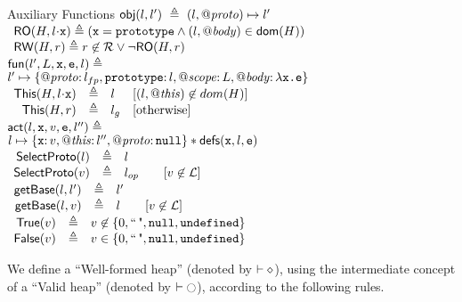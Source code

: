 \documentclass{article}
\begin{document}
\begin{display}{Auxiliary Functions}
%
$\mathsf{obj}(l,l')\ \triangleq\ (l,\mathit{@proto})\mapsto l'$\\
%
$\begin{array}{l}
\ReadOnly(H,l\sv\js{x})\triangleq (\js{x}=\js{prototype}\wedge (l,\bodyp)\in\domain(H))\\
\ReadWrite(H,r)\triangleq r\not\in\refs \vee \neg \ReadOnly(H,r)\end{array}$\\
%
$\mathsf{fun}(l',L,\mbox{\texttt{{\upshape x}}},\mbox{\texttt{{\upshape e}}},l)\triangleq$\\
$ l'\mapsto\{\mathit{@proto}{:\,}l_{fp},\mbox{\texttt{{\upshape prototype}}}{:\,} l,\mathit{@scope}{:\,} L,\mathit{@body}{:\,}\lambda \mbox{\texttt{{\upshape x.e}}}\}$\\
%
$\begin{array}{rlll}
        \pickThis(H,l\sv \js{x})&\triangleq &l &[(l,\thisp)\not\in dom(H)]\\
        \pickThis(H,\njs{r})&\triangleq& \lgo &[\text{otherwise}]
\end{array}$\\
%
$\mathsf{act}(l,\mbox{\texttt{{\upshape x}}},v,\mbox{\texttt{{\upshape e}}},l'') \triangleq$\\
$l\mapsto\{\mbox{\texttt{{\upshape x}}}{:\,} v,\mathit{@this}{:\,} l'',\mathit{@proto}{:\,} \mbox{\texttt{{\upshape null}}}\}\mathbin{*} \mathsf{defs}(\mbox{\texttt{{\upshape x}}},l,\mbox{\texttt{{\upshape e}}})$\\
%
$\begin{array}{rll}
        \mathsf{SelectProto}(l)&\triangleq& l\\
        \mathsf{SelectProto}(v)&\triangleq& l_{op} \qquad[v\not\in\mathcal{L}]
\end{array}$\\
%
$\begin{array}{rll}
        \mathsf{getBase}(l,l')&\triangleq& l'\\
        \mathsf{getBase}(l,v)&\triangleq & l\qquad[v\not\in\mathcal{L}]
\end{array}$\\
%
$\begin{array}{rll}
        \mathsf{True}(v)&\triangleq& v\not\in\{0,\text{``\,"},\mbox{\texttt{{\upshape null}}},\mbox{\texttt{{\upshape undefined}}}\}\\
        \mathsf{False}(v)&\triangleq &v\in\{0,\text{``\,"},\mbox{\texttt{{\upshape null}}},\mbox{\texttt{{\upshape undefined}}}\}
\end{array}$
%
\end{display}




%
We define a ``Well-formed
heap'' (denoted by $\vdash\diamond$), using the intermediate concept of a ``Valid heap'' (denoted by $\vdash\ocircle$), according to the following rules.
  
\end{document}

